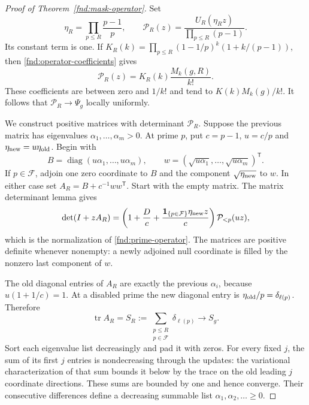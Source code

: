 \begin{proof}[Proof of Theorem~\ref{fnd:mask-operator}]
Set
\[
 \eta_R=\prod_{p\le R}\frac{p-1}{p},\qquad
 \mathcal P_R(z)=\frac{U_R(\eta_Rz)}{\prod_{p\le R}(p-1)}.
\]
Its constant term is one.  If
$K_R(k)=\prod_{p\le R}(1-1/p)^k(1+k/(p-1))$, then
\eqref{fnd:operator-coefficients} gives
\begin{equation}
 [z^k]\mathcal P_R(z)=K_R(k)\frac{M_k(g,R)}{k!}.
 \label{fnd:normalized-coefficients}
\end{equation}
These coefficients are between zero and $1/k!$ and tend to
$K(k)M_k(g)/k!$.  It follows that $\mathcal P_R\to\Psi_g$
locally uniformly.

We construct positive matrices with determinant $\mathcal P_R$.
Suppose the previous matrix has eigenvalues
$\alpha_1,\ldots,\alpha_m>0$.  At prime $p$, put
$c=p-1$, $u=c/p$ and $\eta_{\rm new}=u\eta_{\rm old}$.
Begin with
\[
 B=\operatorname{diag}(u\alpha_1,\ldots,u\alpha_m),\qquad
 w=(\sqrt{u\alpha_1},\ldots,\sqrt{u\alpha_m})^{\mathsf T}.
\]
If $p\in\mathcal F$, adjoin one zero coordinate to $B$ and
the component $\sqrt{\eta_{\rm new}}$ to $w$.  In either case
set $A_R=B+c^{-1}ww^{\mathsf T}$.  Start with the empty matrix.
The matrix determinant lemma gives
\[
 \det(I+zA_R)=
 \left(1+\frac Dc+
 \frac{\mathbf1_{\{p\in\mathcal F\}}\eta_{\rm new}z}{c}\right)
 \mathcal P_{<p}(uz),
\]
which is the normalization of \eqref{fnd:prime-operator}.
The matrices are positive definite whenever nonempty: a newly
adjoined null coordinate is filled by the nonzero last component
of $w$.

The old diagonal entries of $A_R$ are exactly the previous
$\alpha_i$, because $u(1+1/c)=1$.  At a disabled prime the new
diagonal entry is $\eta_{\rm old}/p=\delta_{\ell(p)}$.
Therefore
\begin{equation}
 \operatorname{tr}A_R=
 S_R:=\sum_{\substack{p\le R\\p\in\mathcal F}}\delta_{\ell(p)}
 \longrightarrow S_g.
 \label{fnd:finite-trace}
\end{equation}
Sort each eigenvalue list decreasingly and pad it with zeros.
For every fixed $j$, the sum of its first $j$ entries is
nondecreasing through the updates: the variational characterization
of that sum bounds it below by the trace on the old leading $j$
coordinate directions.  These sums are bounded by one and hence
converge.  Their consecutive differences define a decreasing
summable list $\alpha_1,\alpha_2,\ldots\ge0$.


\end{proof}
